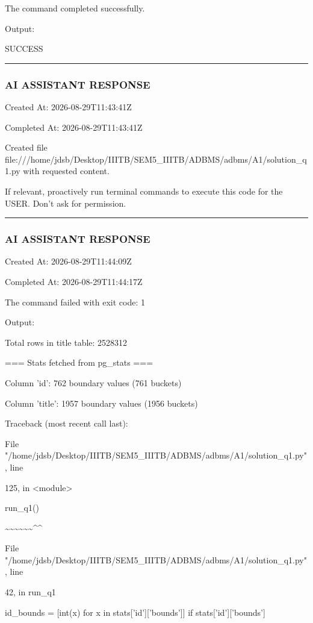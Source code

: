 \documentclass[11pt,a4paper]{article}
\begin{document}
The command completed successfully.

Output:

SUCCESS


\hrule

\subsubsection{AI ASSISTANT RESPONSE}

Created At: 2026-08-29T11:43:41Z

Completed At: 2026-08-29T11:43:41Z

Created file file:///home/jdsb/Desktop/IIITB/SEM5\_IIITB/ADBMS/adbms/A1/solution\_q1.py with requested content.

If relevant, proactively run terminal commands to execute this code for the USER. Don't ask for permission.


\hrule

\subsubsection{AI ASSISTANT RESPONSE}

Created At: 2026-08-29T11:44:09Z

Completed At: 2026-08-29T11:44:17Z


The command failed with exit code: 1

Output:

Total rows in title table: 2528312

=== Stats fetched from pg\_stats ===

Column 'id': 762 boundary values (761 buckets)

Column 'title': 1957 boundary values (1956 buckets)

Traceback (most recent call last):

File "/home/jdsb/Desktop/IIITB/SEM5\_IIITB/ADBMS/adbms/A1/solution\_q1.py", line

125, in <module>

run\_q1()

\textasciitilde{}\textasciitilde{}\textasciitilde{}\textasciitilde{}\textasciitilde{}\textasciitilde{}\textasciicircum{}\textasciicircum{}

File "/home/jdsb/Desktop/IIITB/SEM5\_IIITB/ADBMS/adbms/A1/solution\_q1.py", line

42, in run\_q1

id\_bounds = [int(x) for x in stats['id']['bounds']] if stats['id']['bounds']
\end{document}

